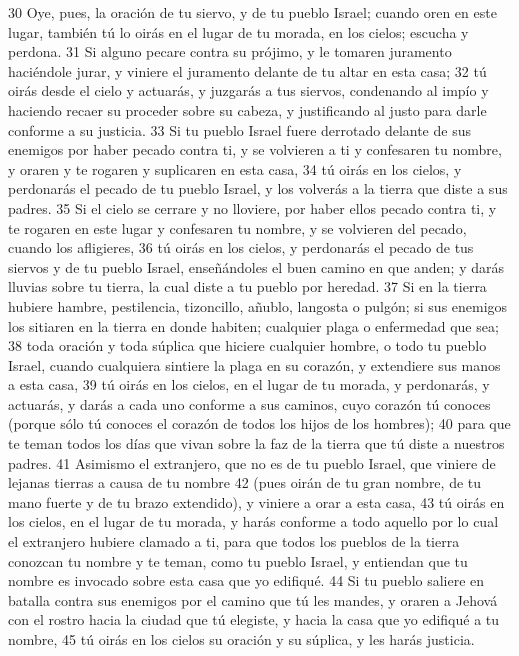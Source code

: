30 Oye, pues, la oración de tu siervo, y de tu pueblo Israel; cuando oren en este lugar, también tú lo oirás en el lugar de tu morada, en los cielos; escucha y perdona.
31 Si alguno pecare contra su prójimo, y le tomaren juramento haciéndole jurar, y viniere el juramento delante de tu altar en esta casa;
32 tú oirás desde el cielo y actuarás, y juzgarás a tus siervos, condenando al impío y haciendo recaer su proceder sobre su cabeza, y justificando al justo para darle conforme a su justicia.
33 Si tu pueblo Israel fuere derrotado delante de sus enemigos por haber pecado contra ti, y se volvieren a ti y confesaren tu nombre, y oraren y te rogaren y suplicaren en esta casa,
34 tú oirás en los cielos, y perdonarás el pecado de tu pueblo Israel, y los volverás a la tierra que diste a sus padres.
35 Si el cielo se cerrare y no lloviere, por haber ellos pecado contra ti, y te rogaren en este lugar y confesaren tu nombre, y se volvieren del pecado, cuando los afligieres,
36 tú oirás en los cielos, y perdonarás el pecado de tus siervos y de tu pueblo Israel, enseñándoles el buen camino en que anden; y darás lluvias sobre tu tierra, la cual diste a tu pueblo por heredad.
37 Si en la tierra hubiere hambre, pestilencia, tizoncillo, añublo, langosta o pulgón; si sus enemigos los sitiaren en la tierra en donde habiten; cualquier plaga o enfermedad que sea;
38 toda oración y toda súplica que hiciere cualquier hombre, o todo tu pueblo Israel, cuando cualquiera sintiere la plaga en su corazón, y extendiere sus manos a esta casa,
39 tú oirás en los cielos, en el lugar de tu morada, y perdonarás, y actuarás, y darás a cada uno conforme a sus caminos, cuyo corazón tú conoces (porque sólo tú conoces el corazón de todos los hijos de los hombres);
40 para que te teman todos los días que vivan sobre la faz de la tierra que tú diste a nuestros padres.
41 Asimismo el extranjero, que no es de tu pueblo Israel, que viniere de lejanas tierras a causa de tu nombre
42 (pues oirán de tu gran nombre, de tu mano fuerte y de tu brazo extendido), y viniere a orar a esta casa,
43 tú oirás en los cielos, en el lugar de tu morada, y harás conforme a todo aquello por lo cual el extranjero hubiere clamado a ti, para que todos los pueblos de la tierra conozcan tu nombre y te teman, como tu pueblo Israel, y entiendan que tu nombre es invocado sobre esta casa que yo edifiqué.
44 Si tu pueblo saliere en batalla contra sus enemigos por el camino que tú les mandes, y oraren a Jehová con el rostro hacia la ciudad que tú elegiste, y hacia la casa que yo edifiqué a tu nombre,
45 tú oirás en los cielos su oración y su súplica, y les harás justicia.
